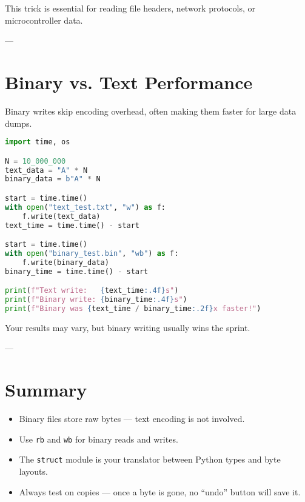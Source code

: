 This trick is essential for reading file headers, network protocols, or microcontroller data.

---

\section{Binary vs. Text Performance}

Binary writes skip encoding overhead, often making them faster for large data dumps.

\begin{lstlisting}[language=Python, caption={Comparing write speeds.}]
import time, os

N = 10_000_000
text_data = "A" * N
binary_data = b"A" * N

start = time.time()
with open("text_test.txt", "w") as f:
    f.write(text_data)
text_time = time.time() - start

start = time.time()
with open("binary_test.bin", "wb") as f:
    f.write(binary_data)
binary_time = time.time() - start

print(f"Text write:   {text_time:.4f}s")
print(f"Binary write: {binary_time:.4f}s")
print(f"Binary was {text_time / binary_time:.2f}x faster!")
\end{lstlisting}

Your results may vary, but binary writing usually wins the sprint.

---

\section*{Summary}

\begin{itemize}
  \item Binary files store raw bytes — text encoding is not involved.
  \item Use \texttt{rb} and \texttt{wb} for binary reads and writes.
  \item The \texttt{struct} module is your translator between Python types and byte layouts.
  \item Always test on copies — once a byte is gone, no “undo” button will save it.
\end{itemize}
